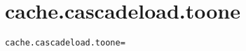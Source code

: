 \section{cache.cascadeload.toone}
\label{configuration:CacheCascadeloadToone}
\AvailableInCsharpOnly{\TODO}
\begin{lstlisting}[style=Props,caption={Usage example for \textit{cache.cascadeload.toone}}]
cache.cascadeload.toone=
\end{lstlisting}